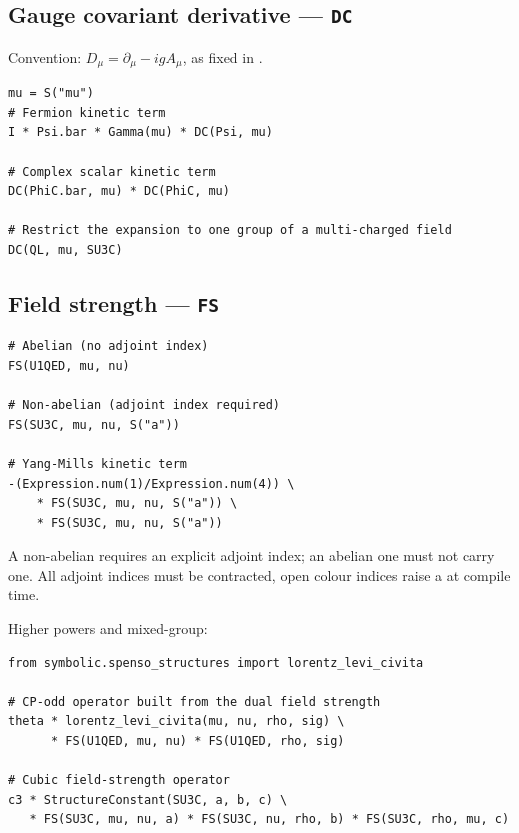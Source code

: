 \subsection*{Gauge covariant derivative --- \texttt{DC}}

Convention: $D_\mu = \partial_\mu - igA_\mu$, as fixed in
.

\begin{verbatim}
mu = S("mu")
# Fermion kinetic term
I * Psi.bar * Gamma(mu) * DC(Psi, mu)

# Complex scalar kinetic term
DC(PhiC.bar, mu) * DC(PhiC, mu)

# Restrict the expansion to one group of a multi-charged field
DC(QL, mu, SU3C)
\end{verbatim}

\subsection*{Field strength --- \texttt{FS}}

\begin{verbatim}
# Abelian (no adjoint index)
FS(U1QED, mu, nu)

# Non-abelian (adjoint index required)
FS(SU3C, mu, nu, S("a"))

# Yang-Mills kinetic term
-(Expression.num(1)/Expression.num(4)) \
    * FS(SU3C, mu, nu, S("a")) \
    * FS(SU3C, mu, nu, S("a"))
\end{verbatim}

\begin{tcolorbox}[warnbox, title={Strict rules for \texttt{FS}}]
A non-abelian  requires an explicit adjoint index; an abelian one must
not carry one.  All adjoint indices must be contracted, open colour
indices raise a \py{ValueError} at compile time.
\end{tcolorbox}

\noindent Higher powers and mixed-group:

\begin{verbatim}
from symbolic.spenso_structures import lorentz_levi_civita

# CP-odd operator built from the dual field strength
theta * lorentz_levi_civita(mu, nu, rho, sig) \
      * FS(U1QED, mu, nu) * FS(U1QED, rho, sig)

# Cubic field-strength operator
c3 * StructureConstant(SU3C, a, b, c) \
   * FS(SU3C, mu, nu, a) * FS(SU3C, nu, rho, b) * FS(SU3C, rho, mu, c)
\end{verbatim}


